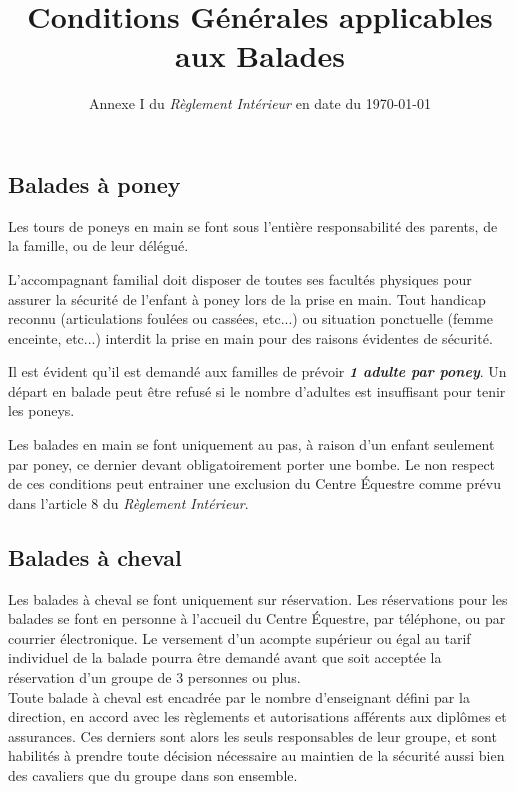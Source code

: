 \documentclass[11pt,a4paper]{article}
\title[Conditions Générales applicables aux Balades \\ version du \today]{Conditions Générales applicables aux Balades}
\subtitle{Annexe I du \textit{Règlement Intérieur} en date du \today}
\author{}
\date{}
\renewcommand{\emph}[1]{\textit{\textbf{#1}}}
\begin{document}
\maketitle


\subsection*{Balades à poney}
Les tours de poneys en main se font sous l'entière responsabilité des parents, de la famille, ou de leur délégué.

L'accompagnant familial doit disposer de toutes ses facultés physiques pour assurer la sécurité de l'enfant à poney lors de la prise en main. Tout handicap reconnu (articulations foulées ou cassées, etc...) ou situation ponctuelle (femme enceinte, etc...) interdit la prise en main pour des raisons évidentes de sécurité.

Il est évident qu'il est demandé aux familles de prévoir \emph{1 adulte par poney}. Un départ en balade peut être refusé si le nombre d'adultes est insuffisant pour tenir les poneys.

Les balades en main se font uniquement au pas, à raison d'un enfant seulement par poney, ce dernier devant obligatoirement porter une bombe. Le non respect de ces conditions peut entrainer une exclusion du Centre Équestre comme prévu dans l'article 8 du \textit{Règlement Intérieur}.

\subsection*{Balades à cheval}
Les balades à cheval se font uniquement sur réservation. Les réservations pour les balades se font en personne à l'accueil du Centre Équestre, par téléphone, ou par courrier électronique. Le versement d'un acompte supérieur ou égal au tarif individuel de la balade pourra être demandé avant que soit acceptée la réservation d'un groupe de 3 personnes ou plus.
\\

Toute balade à cheval est encadrée par le nombre d'enseignant défini par la direction, en accord avec les règlements et autorisations afférents aux diplômes et assurances. Ces derniers sont alors les seuls responsables de leur groupe, et sont habilités à prendre toute décision nécessaire au maintien de la sécurité aussi bien des cavaliers que du groupe dans son ensemble.
\\
\end{document}
